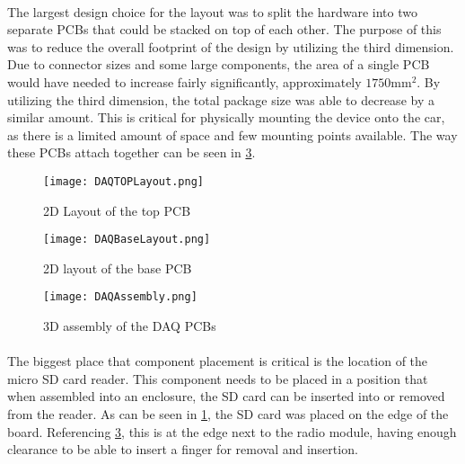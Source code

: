 \paragraph{}
The largest design choice for the layout was to split the hardware into two separate PCBs that could be stacked on top of each other.
The purpose of this was to reduce the overall footprint of the design by utilizing the third dimension.
Due to connector sizes and some large components, the area of a single PCB would have needed to increase fairly significantly, approximately $1750\text{mm}^2$.  By utilizing the third dimension, the total package size was able to decrease by a similar amount.
This is critical for physically mounting the device onto the car, as there is a limited amount of space and few mounting points available.
The way these PCBs attach together can be seen in \cref{fig:PCBAssembly}.

\begin{figure}[H]
	\centering
	\texttt{[image: DAQTOPLayout.png]}
	\caption{2D Layout of the top PCB}
	\label{fig:TopLayout}
\end{figure}

\begin{figure}[H]
	\centering
	\texttt{[image: DAQBaseLayout.png]}
	\caption{2D layout of the base PCB}
	\label{fig:BaseLayout}
\end{figure}

\begin{figure}[H]
	\centering
	\texttt{[image: DAQAssembly.png]}
	\caption{3D assembly of the DAQ PCBs}
	\label{fig:PCBAssembly}
\end{figure}

\paragraph{}
The biggest place that component placement is critical is the location of the micro SD card reader.
This component needs to be placed in a position that when assembled into an enclosure, the SD card can be inserted into or removed from the reader.
As can be seen in \cref{fig:TopLayout}, the SD card was placed on the edge of the board.
Referencing \cref{fig:PCBAssembly}, this is at the edge next to the radio module, having enough clearance to be able to insert a finger for removal and insertion.